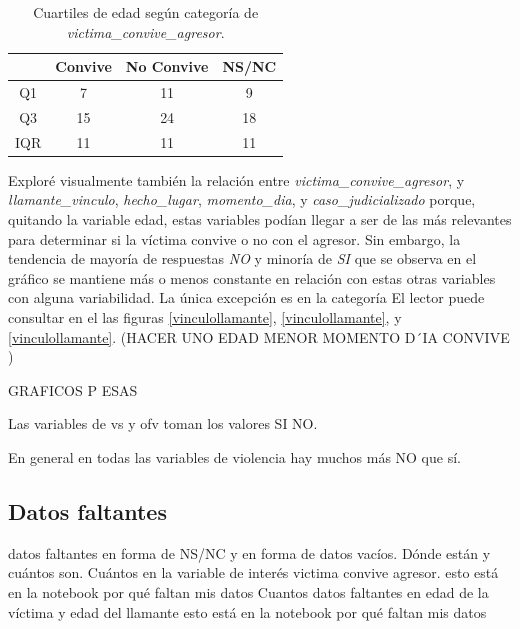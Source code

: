 \documentclass[10 pt]{article}
\begin{document}
\begin{table}[H]
    \begin{center}
    \caption{Cuartiles de edad según categoría de \textit{victima\_convive\_agresor}.}
    \label{cuartilesconviveedad}
    \begin{tabular}{cccc}
    \hline
    \multicolumn{1}{r}{\textbf{}} & \textbf{Convive} & \textbf{No Convive} & \textbf{ NS/NC} \\ \hline
    Q1                            & 7                    & 11                   & 9                       \\
    Q3                            & 15                   & 24                   & 18                      \\
    IQR                           & 11                   & 11                   & 11                     \\ \hline
    \end{tabular}
    \end{center}
    \end{table}


Exploré visualmente también la relación entre \textit{victima\_convive\_agresor}, y \textit{llamante\_vinculo}, \textit{hecho\_lugar}, \textit{momento\_dia}, y \textit{caso\_judicializado} porque, quitando la variable edad, estas variables podían llegar a ser de las más relevantes para determinar si la víctima convive o no con el agresor. Sin embargo, la tendencia de mayoría de respuestas \textit{NO} y minoría de \textit{SI} que se observa en el gráfico  se mantiene más o menos constante en relación con estas otras variables con alguna variabilidad. La única excepción es en la categoría \vecino El lector puede consultar en el  las figuras \ref{vinculollamante}, \ref{vinculollamante}, y \ref{vinculollamante}.   (HACER UNO EDAD MENOR MOMENTO D´IA CONVIVE )

GRAFICOS P ESAS

Las variables de vs y ofv toman los valores SI NO.

En general en todas las variables de violencia hay muchos más NO que sí.

\subsection*{Datos faltantes}\label{faltantes}

datos faltantes en forma de NS/NC y en forma de datos vacíos. Dónde están y cuántos son. Cuántos en la variable de interés victima convive agresor. esto está en la notebook por qué faltan mis datos
Cuantos datos faltantes en edad de la víctima y edad del llamante esto está en la notebook por qué faltan mis datos
\end{document}
